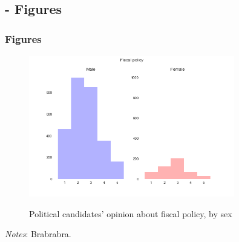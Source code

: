 \documentclass[10pt]{beamer}
\begin{document}
\subsection{- Figures}

\begin{frame}
  \frametitle{Figures}

\begin{figure}[H]
	\begin{center}
	\caption{Political candidates' opinion about fiscal policy, by sex} 
	\includegraphics[width=0.8\textwidth]{yn_fiscalpol_bysex_py.png} \label{fig:hist2} 
	\end{center}
	\vspace{-5mm}
\end{figure}
{\footnotesize {\it Notes}: Brabrabra.}

\end{frame}
\end{document}
